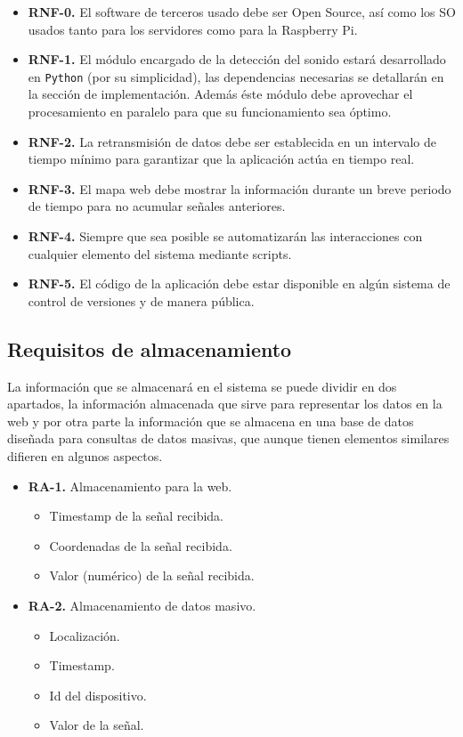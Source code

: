 \begin{itemize}
  \item \textbf{RNF-0.} El software de terceros usado debe ser Open Source, así como los SO usados tanto para los servidores como para la Raspberry Pi.
  \item \textbf{RNF-1.} El módulo encargado de la detección del sonido estará desarrollado en {\tt Python} (por su simplicidad), las dependencias necesarias se detallarán en la sección de implementación. Además éste módulo debe aprovechar el procesamiento en paralelo para que su funcionamiento sea óptimo.
  \item \textbf{RNF-2.} La retransmisión de datos debe ser establecida en un intervalo de tiempo mínimo para garantizar que la aplicación actúa en tiempo real.
  \item \textbf{RNF-3.} El mapa web debe mostrar la información durante un breve periodo de tiempo para no acumular señales anteriores.
  \item \textbf{RNF-4.} Siempre que sea posible se automatizarán las interacciones con cualquier elemento del sistema mediante scripts.
  \item \textbf{RNF-5.} El código de la aplicación debe estar disponible en algún sistema de control de versiones y de manera pública.
\end{itemize}

\subsection{Requisitos de almacenamiento}

La información que se almacenará en el sistema se puede dividir en dos apartados, la información almacenada que sirve para representar los datos en la web y por otra parte la información que se almacena en una base de datos diseñada para consultas de datos masivas, que aunque tienen elementos similares difieren en algunos aspectos.

\begin{itemize}
  \item \textbf{RA-1.} Almacenamiento para la web.
  \begin{itemize}
    \item Timestamp de la señal recibida.
    \item Coordenadas de la señal recibida.
    \item Valor (numérico) de la señal recibida.
  \end{itemize}
  \item \textbf{RA-2.} Almacenamiento de datos masivo.
  \begin{itemize}
    \item Localización.
    \item Timestamp.
    \item Id del dispositivo.
    \item Valor de la señal.
  \end{itemize}
\end{itemize}

